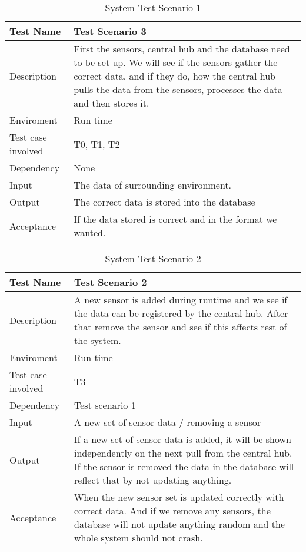 \documentclass[../document]{subfiles}
\begin{document}
\begin{table}[H]
\caption{System Test Scenario 1}
\centering
\begin{tabularx}{\textwidth}{|l|X|}
	\hline
	Test Name
	&Test Scenario 3
	\\ \hline Description
	&First the sensors, central hub and the database need to be set up. We will see if the sensors gather the correct data, and if they do, how the central hub pulls the data from the sensors, processes the data and then stores it.
	\\ \hline Enviroment
	&Run time
	\\ \hline Test case involved
	&T0, T1, T2
	\\ \hline Dependency
	&None
	\\ \hline Input
	&The data of surrounding environment.
	\\ \hline Output
	&The correct data is stored into the database
	\\ \hline Acceptance
	&If the data stored is correct and in the format we wanted.		
	\\ \hline 
\end{tabularx}
\end{table}

\begin{table}[H]
\caption{System Test Scenario 2}
\centering
\begin{tabularx}{\textwidth}{|l|X|}
	\hline
	Test Name
	&Test Scenario 2
	\\ \hline Description
	&A new sensor is added during runtime and we see if the data can be registered by the central hub. After that remove the sensor and see if this affects rest of the system. 
	\\ \hline Enviroment
	&Run time
	\\ \hline Test case involved
	&T3
	\\ \hline Dependency
	&Test scenario 1
	\\ \hline Input
	&A new set of sensor data / removing a sensor
	\\ \hline Output
	&If a new set of sensor data is added, it will be shown independently on the next pull from the central hub. If the sensor is removed the data in the database will reflect that by not updating anything.
	\\ \hline Acceptance
	&When the new sensor set is updated correctly with correct data. And if we remove any sensors, the database will not update anything random and the whole system should not crash.
	\\ \hline 
\end{tabularx}
\end{table}
\end{document}
